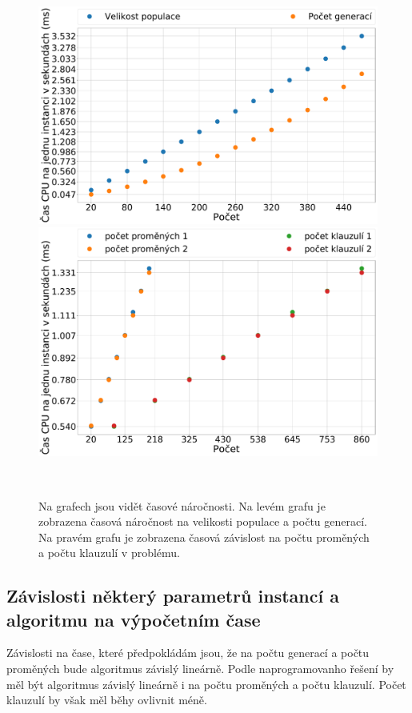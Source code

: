 \documentclass[11pt]{article}
\begin{document}
\begin{figure}
	\centering
    \begin{minipage}[c]{0.48\textwidth}
        \centering\includegraphics[width=\textwidth]{img/time_gen_cnt_sz.pdf} 
    \end{minipage}
    \begin{minipage}[c]{0.48\textwidth}
        \centering \includegraphics[width=\textwidth]{img/time_n_var_cla.pdf} 
    \end{minipage}
    \\
   \caption{Na grafech jsou vidět časové náročnosti. Na levém grafu je zobrazena časová náročnost na velikosti populace a počtu generací. Na pravém grafu je zobrazena časová závislost na počtu proměných a počtu klauzulí v problému.}\label{fig:time}
\end{figure} 
\subsection{Závislosti některý parametrů instancí a algoritmu na výpočetním čase}
Závislosti na čase, které předpokládám jsou, že na počtu generací a počtu proměných bude algoritmus závislý lineárně. Podle naprogramovanho řešení by měl být algoritmus závislý lineárně i na počtu proměných a počtu klauzulí. Počet klauzulí by však měl běhy ovlivnit méně. 
\end{document}
